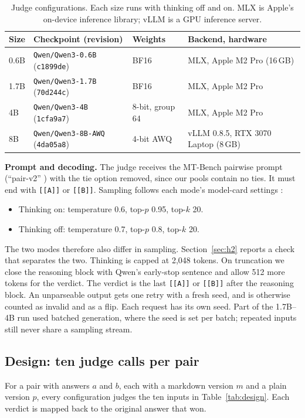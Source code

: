 \documentclass[10pt]{article}
\begin{document}
\begin{table}[H]
\centering\small
\caption{Judge configurations. Each size runs with thinking off and on. MLX is Apple's on-device inference
library; vLLM is a GPU inference server.}
\label{tab:judges}
\begin{tabular}{llll}
\toprule
Size & Checkpoint (revision) & Weights & Backend, hardware \\
\midrule
0.6B & \texttt{Qwen/Qwen3-0.6B} (\texttt{c1899de}) & BF16 & MLX, Apple M2 Pro (16\,GB) \\
1.7B & \texttt{Qwen/Qwen3-1.7B} (\texttt{70d244c}) & BF16 & MLX, Apple M2 Pro \\
4B & \texttt{Qwen/Qwen3-4B} (\texttt{1cfa9a7}) & 8-bit, group 64 & MLX, Apple M2 Pro \\
8B & \texttt{Qwen/Qwen3-8B-AWQ} (\texttt{4da05a8}) & 4-bit AWQ & vLLM 0.8.5, RTX 3070 Laptop (8\,GB) \\
\bottomrule
\end{tabular}
\end{table}

\textbf{Prompt and decoding.} The judge receives the MT-Bench pairwise prompt (``pair-v2''
\citep{zheng2023judging}) with the tie option removed, since our pools contain no ties. It must end with
\texttt{[[A]]} or \texttt{[[B]]}. Sampling follows each mode's model-card settings \citep{qwen2025qwen3}:
\begin{itemize}
\item Thinking on: temperature 0.6, top-$p$ 0.95, top-$k$ 20.
\item Thinking off: temperature 0.7, top-$p$ 0.8, top-$k$ 20.
\end{itemize}
The two modes therefore also differ in sampling. Section~\ref{sec:h2} reports a check that separates the two.
Thinking is capped at 2{,}048 tokens. On truncation we close the reasoning block with Qwen's early-stop sentence
and allow 512 more tokens for the verdict. The verdict is the last \texttt{[[A]]} or \texttt{[[B]]} after the
reasoning block. An unparseable output gets one retry with a fresh seed, and is otherwise counted as invalid and
as a flip. Each request has its own seed. Part of the 1.7B--4B run used batched generation, where the seed is set
per batch; repeated inputs still never share a sampling stream.

\subsection{Design: ten judge calls per pair}
For a pair with answers $a$ and $b$, each with a markdown version $m$ and a plain version $p$, every configuration
judges the ten inputs in Table~\ref{tab:design}. Each verdict is mapped back to the original answer that won.
\end{document}
